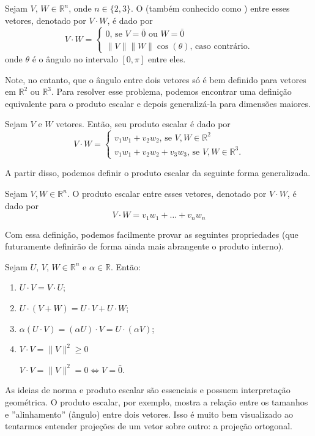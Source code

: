 \documentclass[../main.tex]{subfiles}
\begin{document}
		\begin{definicao}
			Sejam $V,\, W\in \mathbb{R}^n$, onde $n\in \{2,3\}$. O  (também conhecido como ) entre esses vetores, denotado por $V\cdot W$, é dado por
			\[
			V\cdot W = \begin{cases}
				0\text{, se $V=\bar{0}$ ou $W=\bar{0}$}\\
				\|V\|\|W\|\cos(\theta)\text{, caso contrário.}
			\end{cases}
			\]
			onde $\theta$ é o ângulo no intervalo $[0,\pi]$ entre eles. 
		\end{definicao}
		Note, no entanto, que o ângulo entre dois vetores só é bem definido para vetores em $\mathbb{R}^2$ ou $\mathbb{R}^3$. Para resolver esse problema, podemos encontrar uma definição equivalente para o produto escalar e depois generalizá-la para dimensões maiores.
		\begin{proposicao}
			Sejam $V$ e $W$ vetores. Então, seu produto escalar é dado por
			\[
			V\cdot W = \begin{cases}
				v_1w_1+v_2w_2\text{, se $V,W \in \mathbb{R}^2$}\\
					
					v_1 w_1 +v_2 w_2 + v_3 w_3\text{, se $V, W \in \mathbb{R}^3$.}
			\end{cases}
			\]
		\end{proposicao}
		A partir disso, podemos definir o produto escalar da seguinte forma generalizada.
		\begin{definicao}
			Sejam $V, W\in \mathbb{R}^n$. O produto escalar entre esses vetores, denotado por $V\cdot W$, é dado por
			\[
			V\cdot W = v_1 w_1+\dots + v_n w_n
			\]
		\end{definicao}
		Com essa definição, podemos facilmente provar as seguintes propriedades (que futuramente definirão de forma ainda mais abrangente o produto interno).
		\begin{proposicao}
			Sejam $U,\, V,\, W\in \mathbb{R}^n$ e $\alpha \in \mathbb{R}$. Então:
			\begin{enumerate}[label=\roman*)]
				\item $U\cdot V=V\cdot U$;
				\item $U\cdot (V+W)=U\cdot V+U\cdot W$;
				\item $\alpha(U\cdot V)=(\alpha U)\cdot V = U\cdot (\alpha V)$;
				\item $V\cdot V=\|V\|^2\geq 0$
				
				$V\cdot V=\|V\|^2=0 \Leftrightarrow V = \bar{0}$.
			\end{enumerate}
		\end{proposicao}
		As ideias de norma e produto escalar são essenciais e possuem interpretação geométrica. O produto escalar, por exemplo, mostra a relação entre os tamanhos e ''alinhamento'' (ângulo) entre dois vetores. Isso é muito bem visualizado ao tentarmos entender projeções de um vetor sobre outro: a projeção ortogonal.
		
\end{document}
